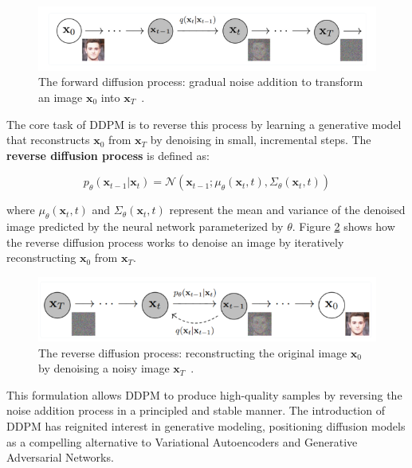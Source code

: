\documentclass[12pt,DIV14,BCOR12mm,a4paper,footinclude=false,headinclude,parskip=half-,twoside,openright,cleardoublepage=empty,toc=index,bibliography=totoc,listof=totoc]{scrreprt}
\numberwithin{equation}{chapter}
\begin{document}
\begin{figure}
	\centering
	\includegraphics[scale=.9]{../media/diffusion_forward_process.png}
	\caption{The forward diffusion process: gradual noise addition to transform an image \(\mathbf{x}_0\) into \(\mathbf{x}_T\)~\cite{yainnoware2022}.}
	\label{forward}
\end{figure}

The core task of DDPM is to reverse this process by learning a generative model that reconstructs \(\mathbf{x}_0\) from \(\mathbf{x}_T\) by denoising in small, incremental steps. The \textbf{reverse diffusion process} is defined as:

\begin{equation}
p_\theta(\mathbf{x}_{t-1} | \mathbf{x}_t) = \mathcal{N}(\mathbf{x}_{t-1}; \mu_\theta(\mathbf{x}_t, t), \Sigma_\theta(\mathbf{x}_t, t))
\end{equation}

where \(\mu_\theta(\mathbf{x}_t, t)\) and \(\Sigma_\theta(\mathbf{x}_t, t)\) represent the mean and variance of the denoised image predicted by the neural network parameterized by \(\theta\). Figure \ref{reverse} shows how the reverse diffusion process works to denoise an image by iteratively reconstructing \(\mathbf{x}_0\) from \(\mathbf{x}_T\).

\begin{figure}
	\centering
	\includegraphics[scale=.9]{../media/diffusion_reverse_process.png}
	\caption{The reverse diffusion process: reconstructing the original image \(\mathbf{x}_0\) by denoising a noisy image \(\mathbf{x}_T\)~\cite{diffusion2}.}
	\label{reverse}
\end{figure}

This formulation allows DDPM to produce high-quality samples by reversing the noise addition process in a principled and stable manner. The introduction of DDPM has reignited interest in generative modeling, positioning diffusion models as a compelling alternative to Variational Autoencoders and Generative Adversarial Networks.
\end{document}
